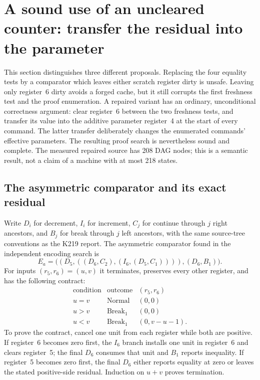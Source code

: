 \section{A sound use of an uncleared counter: transfer the residual into the parameter}
\label{sec:dirty-counter-salt}

This section distinguishes three different proposals.  Replacing the four
equality tests by a comparator which leaves either scratch register dirty
is unsafe.  Leaving only register~6 dirty avoids a forged cache, but it
still corrupts the first freshness test and the proof enumeration.  A
repaired variant has an ordinary, unconditional correctness argument:
clear register~6 between the two freshness tests, and transfer its value
into the additive parameter register~4 at the start of every command.
The latter transfer deliberately changes the enumerated commands' effective
parameters.  The resulting proof search is nevertheless sound and complete.
The measured repaired source has 208 DAG nodes; this is a semantic result,
not a claim of a machine with at most 218 states.

\subsection{The asymmetric comparator and its exact residual}

Write $D_i$ for decrement, $I_i$ for increment, $C_j$ for continue through
$j$ right ancestors, and $B_j$ for break through $j$ left ancestors, with
the same source-tree conventions as the K219 report.  The asymmetric
comparator found in the independent encoding search is
\[
 E_a=\bigl((D_5,((D_6,C_2),(I_6,(D_5,C_1)))),(D_6,B_1)\bigr).
\]
For inputs $(r_5,r_6)=(u,v)$ it terminates, preserves every other register,
and has the following contract:
\[
\begin{array}{c|c|c}
\text{condition}&\text{outcome}&(r_5,r_6)\\\hline
u=v&\mathrm{Normal}&(0,0)\\
u>v&\mathrm{Break}_1&(0,0)\\
u<v&\mathrm{Break}_1&(0,v-u-1).
\end{array}
\]
To prove the contract, cancel one unit from each register while both are
positive.  If register~6 becomes zero first, the $I_6$ branch installs one
unit in register~6 and clears register~5; the final $D_6$ consumes that
unit and $B_1$ reports inequality.  If register~5 becomes zero first,
the final $D_6$ either reports equality at zero or leaves the stated
positive-side residual.  Induction on $u+v$ proves termination.

